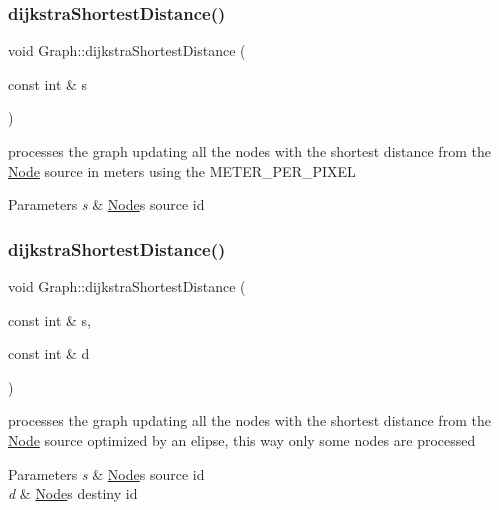 \subsubsection{\texorpdfstring{dijkstra\+Shortest\+Distance()}{dijkstraShortestDistance()}\hspace{0.1cm}{\footnotesize\ttfamily [1/2]}}
{\footnotesize\ttfamily void Graph\+::dijkstra\+Shortest\+Distance (\begin{DoxyParamCaption}\item[{const int \&}]{s }\end{DoxyParamCaption})}



processes the graph updating all the nodes with the shortest distance from the \hyperlink{class_node}{Node} source in meters using the M\+E\+T\+E\+R\+\_\+\+P\+E\+R\+\_\+\+P\+I\+X\+EL 


\begin{DoxyParams}{Parameters}
{\em s} & \hyperlink{class_node}{Node}\textquotesingle{}s source id \\
\hline
\end{DoxyParams}
\mbox{\label{class_graph_aa7ed404a514a3c1bbbd7b9404b715b85}} 
\subsubsection{\texorpdfstring{dijkstra\+Shortest\+Distance()}{dijkstraShortestDistance()}\hspace{0.1cm}{\footnotesize\ttfamily [2/2]}}
{\footnotesize\ttfamily void Graph\+::dijkstra\+Shortest\+Distance (\begin{DoxyParamCaption}\item[{const int \&}]{s,  }\item[{const int \&}]{d }\end{DoxyParamCaption})}



processes the graph updating all the nodes with the shortest distance from the \hyperlink{class_node}{Node} source optimized by an elipse, this way only some nodes are processed 


\begin{DoxyParams}{Parameters}
{\em s} & \hyperlink{class_node}{Node}\textquotesingle{}s source id \\
\hline
{\em d} & \hyperlink{class_node}{Node}\textquotesingle{}s destiny id \\
\hline
\end{DoxyParams}
\mbox{\label{class_graph_aae706b755ac7ac2c155ac06dc52f25be}} 
